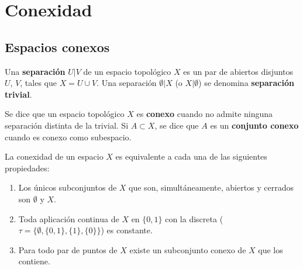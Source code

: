 \section{Conexidad}

\subsection{Espacios conexos}

\begin{definición}[Separación]
    Una \textbf{separación} $U|V$ de un espacio topológico $X$ es un par de abiertos disjuntos $U$, $V$, tales que $X = U \cup V$. Una separación $\emptyset|X$ (o $X|\emptyset$) se denomina \textbf{separación trivial}.
\end{definición}
\begin{definición}[Conexo]
    Se dice que un espacio topológico $X$ es \textbf{conexo} cuando no admite ninguna separación distinta de la trivial. Si $A \subset X$, se dice que $A$ es un \textbf{conjunto conexo} cuando es conexo como subespacio.
\end{definición}
\begin{proposición}
    La conexidad de un espacio $X$ es equivalente a cada una de las siguientes propiedades:
    \begin{enumerate}[label=\alph*)]
        \item Los únicos subconjuntos de $X$ que son, simultáneamente, abiertos y cerrados son $\emptyset$ y $X$.
        \item Toda aplicación continua de $X$ en $\{0, 1\}$ con la discreta ($\tau = \{\emptyset, \{0, 1\}, \{1\}, \{0\}\}$) es constante. 
        \item Para todo par de puntos de $X$ existe un subconjunto conexo de $X$ que los contiene.
    \end{enumerate}
\end{proposición}
